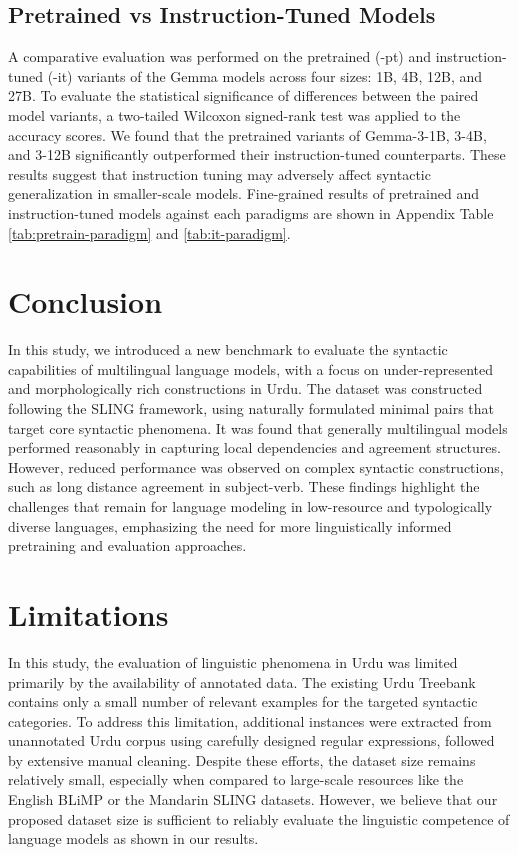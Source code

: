 \documentclass[11pt]{article}
\begin{document}
\subsection{ Pretrained vs Instruction-Tuned Models}
A comparative evaluation was performed on the pretrained (-pt) and instruction-tuned (-it) variants of the Gemma models across four sizes: 1B, 4B, 12B, and 27B. To evaluate the statistical significance of differences between the paired model variants, a two-tailed Wilcoxon signed-rank test was applied to the accuracy scores.
We found that the pretrained variants of Gemma-3-1B, 3-4B, and 3-12B significantly outperformed their instruction-tuned counterparts. These results suggest that instruction tuning may adversely affect syntactic generalization in smaller-scale models. Fine-grained results of pretrained and instruction-tuned models against each paradigms are shown in Appendix Table  \ref{tab:pretrain-paradigm}  and \ref{tab:it-paradigm}.

\section{Conclusion}
In this study, we introduced a new benchmark 
to evaluate the syntactic capabilities of multilingual language models, with a focus on under-represented and morphologically rich constructions in Urdu. The dataset was constructed following the SLING framework, using naturally formulated minimal pairs that target core syntactic phenomena. It was found that generally multilingual models performed reasonably in capturing local dependencies and agreement structures. However, reduced performance was observed on complex syntactic constructions, such as long distance agreement in subject-verb. These findings highlight the challenges that remain for language modeling in low-resource and typologically diverse languages, emphasizing the need for more linguistically informed pretraining and evaluation approaches.


\section*{Limitations}
In this study, the evaluation of linguistic phenomena in Urdu was limited primarily by the availability of annotated data. The existing Urdu Treebank contains only a small number of relevant examples for the targeted syntactic categories. To address this limitation, additional instances were extracted from unannotated Urdu corpus using carefully designed regular expressions, followed by extensive manual cleaning. Despite these efforts, the dataset size remains relatively small, especially when compared to large-scale resources like the English BLiMP or the Mandarin SLING datasets. However, we believe that our proposed dataset size is sufficient to reliably evaluate the linguistic competence of language models as shown in our results.
\end{document}
